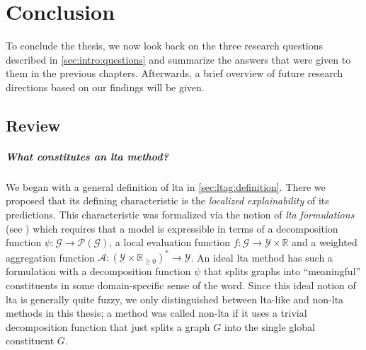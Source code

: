 \chapter{Conclusion}%
\label{sec:conclusion}

To conclude the thesis, we now look back on the three research questions described in \cref{sec:intro:questions} and summarize the answers that were given to them in the previous chapters.
Afterwards, a brief overview of future research directions based on our findings will be given.

\section{Review}%
\label{sec:conclusion:review}

\paragraph{\; What constitutes an \ac{lta} method?}
We began with a general definition of \ac{lta} in \cref{sec:ltag:definition}.
There we proposed that its defining characteristic is the \textit{localized explainability} of its predictions.
This characteristic was formalized via the notion of \textit{\ac{lta} formulations} (see ) which requires that a model is expressible in terms of a decomposition function $\psi: \mathcal{G} \to \mathcal{P}(\mathcal{G})$, a local evaluation function $f: \mathcal{G} \to \mathcal{Y} \times \mathbb{R}$ and a weighted aggregation function $\mathcal{A}: {(\mathcal{Y} \times \mathbb{R}_{\geq 0})}^* \to \mathcal{Y}$.
An ideal \ac{lta} method has such a formulation with a decomposition function $\psi$ that splits graphs into ``meaningful'' constituents in some domain-specific sense of the word.
Since this ideal notion of \ac{lta} is generally quite fuzzy, we only distinguished between \acs{lta}-like and non-\acs{lta} methods in this thesis;
a method was called non-\acs{lta} if it uses a trivial decomposition function that just splits a graph $G$ into the single global constituent $G$.

